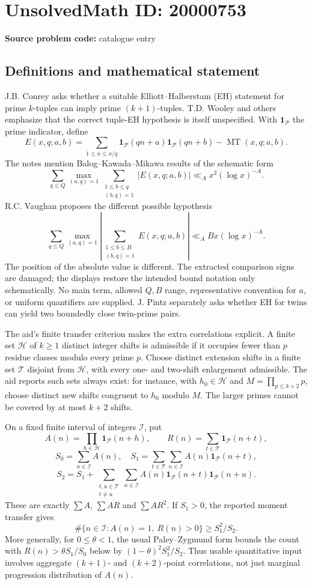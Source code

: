 \documentclass[11pt]{article}
\begin{document}
\section*{UnsolvedMath ID: 20000753}
\textbf{Source problem code:} catalogue entry
\subsection{Definitions and mathematical statement}
J.B. Conrey asks whether a suitable Elliott--Halberstam (EH) statement for prime $k$-tuples can imply prime $(k+1)$-tuples. T.D. Wooley and others emphasize that the correct tuple-EH hypothesis is itself unspecified. With $\mathbf1_{\mathcal P}$ the prime indicator, define
\[
 E(x,q;a,b)=\sum_{1\leq n\leq x/q}\mathbf1_{\mathcal P}(qn+a)\mathbf1_{\mathcal P}(qn+b)-\operatorname{MT}(x,q;a,b).
\]
The notes mention Balog--Kawada--Mikawa results of the schematic form
\[
 \sum_{q\leq Q}\max_{(a,q)=1}\sum_{\substack{1\leq b\leq q\\(b,q)=1}}
       |E(x,q;a,b)|\ll_A x^2(\log x)^{-A}.
\]
R.C. Vaughan proposes the different possible hypothesis
\[
 \sum_{q\leq Q}\max_{(a,q)=1}
 \left|\sum_{\substack{1\leq b\leq B\\(b,q)=1}}E(x,q;a,b)\right|
 \ll_A Bx(\log x)^{-A}.
\]
The position of the absolute value is different. The extracted comparison signs are damaged; the displays restore the intended bound notation only schematically. No main term, allowed $Q,B$ range, representative convention for $a$, or uniform quantifiers are supplied. J. Pintz separately asks whether EH for twins can yield two boundedly close twin-prime pairs.

The aid's finite transfer criterion makes the extra correlations explicit. A finite set $\mathcal H$ of $k\geq1$ distinct integer shifts is admissible if it occupies fewer than $p$ residue classes modulo every prime $p$. Choose distinct extension shifts in a finite set $\mathcal T$ disjoint from $\mathcal H$, with every one- and two-shift enlargement admissible. The aid reports such sets always exist: for instance, with $h_0\in\mathcal H$ and $M=\prod_{p\leq k+2}p$, choose distinct new shifts congruent to $h_0$ modulo $M$. The larger primes cannot be covered by at most $k+2$ shifts.

On a fixed finite interval of integers $\mathcal I$, put
\[
 A(n)=\prod_{h\in\mathcal H}\mathbf1_{\mathcal P}(n+h),\qquad
 R(n)=\sum_{t\in\mathcal T}\mathbf1_{\mathcal P}(n+t),
\]
\[
 S_0=\sum_{n\in\mathcal I}A(n),\quad
 S_1=\sum_{t\in\mathcal T}\sum_{n\in\mathcal I}A(n)\mathbf1_{\mathcal P}(n+t),
\]
\[
 S_2=S_1+\sum_{\substack{t,u\in\mathcal T\\t\neq u}}
 \sum_{n\in\mathcal I}A(n)\mathbf1_{\mathcal P}(n+t)\mathbf1_{\mathcal P}(n+u).
\]
These are exactly $\sum A$, $\sum AR$ and $\sum AR^2$. If $S_1>0$, the reported moment transfer gives
\[
 \#\{n\in\mathcal I:A(n)=1,\ R(n)>0\}\geq S_1^2/S_2.
\]
More generally, for $0\leq\theta<1$, the usual Paley--Zygmund form bounds the count with $R(n)>\theta S_1/S_0$ below by $(1-\theta)^2S_1^2/S_2$. Thus usable quantitative input involves aggregate $(k+1)$- and $(k+2)$-point correlations, not just marginal progression distribution of $A(n)$.
\end{document}
